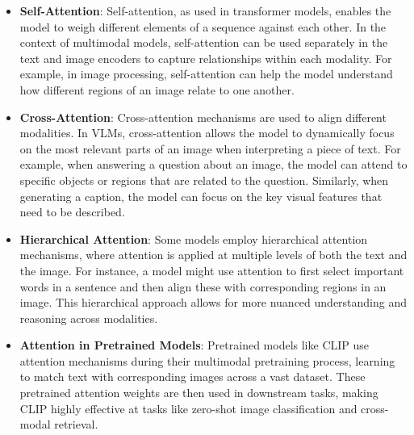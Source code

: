 \begin{itemize}
    \item \textbf{Self-Attention}: Self-attention, as used in transformer models, enables the model to weigh different elements of a sequence against each other. In the context of multimodal models, self-attention can be used separately in the text and image encoders to capture relationships within each modality. For example, in image processing, self-attention can help the model understand how different regions of an image relate to one another.
    \item \textbf{Cross-Attention}: Cross-attention mechanisms are used to align different modalities. In VLMs, cross-attention allows the model to dynamically focus on the most relevant parts of an image when interpreting a piece of text. For example, when answering a question about an image, the model can attend to specific objects or regions that are related to the question. Similarly, when generating a caption, the model can focus on the key visual features that need to be described.
    \item \textbf{Hierarchical Attention}: Some models employ hierarchical attention mechanisms, where attention is applied at multiple levels of both the text and the image. For instance, a model might use attention to first select important words in a sentence and then align these with corresponding regions in an image. This hierarchical approach allows for more nuanced understanding and reasoning across modalities.
    \item \textbf{Attention in Pretrained Models}: Pretrained models like CLIP use attention mechanisms during their multimodal pretraining process, learning to match text with corresponding images across a vast dataset. These pretrained attention weights are then used in downstream tasks, making CLIP highly effective at tasks like zero-shot image classification and cross-modal retrieval.
\end{itemize}
